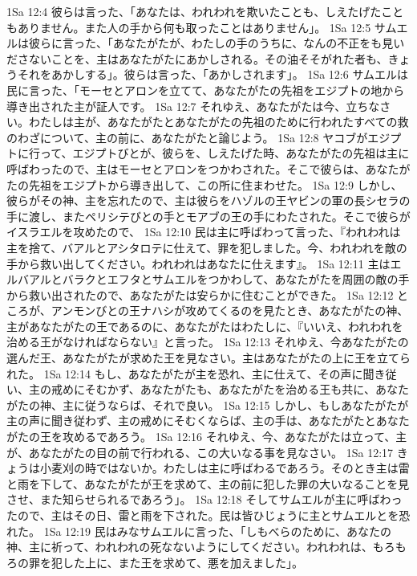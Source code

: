 1Sa 12:4  彼らは言った、「あなたは、われわれを欺いたことも、しえたげたこともありません。また人の手から何も取ったことはありません」。
1Sa 12:5  サムエルは彼らに言った、「あなたがたが、わたしの手のうちに、なんの不正をも見いださないことを、主はあなたがたにあかしされる。その油そそがれた者も、きょうそれをあかしする」。彼らは言った、「あかしされます」。
1Sa 12:6  サムエルは民に言った、「モーセとアロンを立てて、あなたがたの先祖をエジプトの地から導き出された主が証人です。
1Sa 12:7  それゆえ、あなたがたは今、立ちなさい。わたしは主が、あなたがたとあなたがたの先祖のために行われたすべての救のわざについて、主の前に、あなたがたと論じよう。
1Sa 12:8  ヤコブがエジプトに行って、エジプトびとが、彼らを、しえたげた時、あなたがたの先祖は主に呼ばわったので、主はモーセとアロンをつかわされた。そこで彼らは、あなたがたの先祖をエジプトから導き出して、この所に住まわせた。
1Sa 12:9  しかし、彼らがその神、主を忘れたので、主は彼らをハゾルの王ヤビンの軍の長シセラの手に渡し、またペリシテびとの手とモアブの王の手にわたされた。そこで彼らがイスラエルを攻めたので、
1Sa 12:10  民は主に呼ばわって言った、『われわれは主を捨て、バアルとアシタロテに仕えて、罪を犯しました。今、われわれを敵の手から救い出してください。われわれはあなたに仕えます』。
1Sa 12:11  主はエルバアルとバラクとエフタとサムエルをつかわして、あなたがたを周囲の敵の手から救い出されたので、あなたがたは安らかに住むことができた。
1Sa 12:12  ところが、アンモンびとの王ナハシが攻めてくるのを見たとき、あなたがたの神、主があなたがたの王であるのに、あなたがたはわたしに、『いいえ、われわれを治める王がなければならない』と言った。
1Sa 12:13  それゆえ、今あなたがたの選んだ王、あなたがたが求めた王を見なさい。主はあなたがたの上に王を立てられた。
1Sa 12:14  もし、あなたがたが主を恐れ、主に仕えて、その声に聞き従い、主の戒めにそむかず、あなたがたも、あなたがたを治める王も共に、あなたがたの神、主に従うならば、それで良い。
1Sa 12:15  しかし、もしあなたがたが主の声に聞き従わず、主の戒めにそむくならば、主の手は、あなたがたとあなたがたの王を攻めるであろう。
1Sa 12:16  それゆえ、今、あなたがたは立って、主が、あなたがたの目の前で行われる、この大いなる事を見なさい。
1Sa 12:17  きょうは小麦刈の時ではないか。わたしは主に呼ばわるであろう。そのとき主は雷と雨を下して、あなたがたが王を求めて、主の前に犯した罪の大いなることを見させ、また知らせられるであろう」。
1Sa 12:18  そしてサムエルが主に呼ばわったので、主はその日、雷と雨を下された。民は皆ひじょうに主とサムエルとを恐れた。
1Sa 12:19  民はみなサムエルに言った、「しもべらのために、あなたの神、主に祈って、われわれの死なないようにしてください。われわれは、もろもろの罪を犯した上に、また王を求めて、悪を加えました」。
